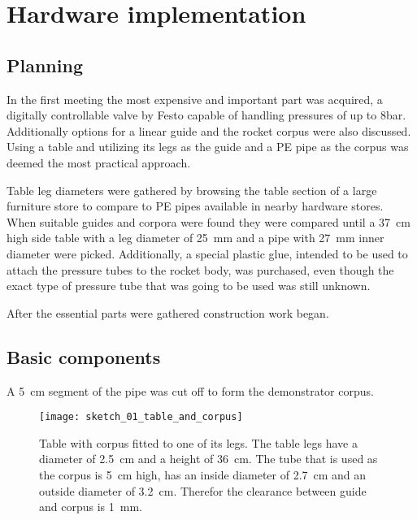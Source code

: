 \section{Hardware implementation}
\author{Sebastian Schaffler}
\subsection{Planning}
In the first meeting the most expensive and important part was acquired, a digitally controllable valve by Festo \cite{festo-valve} capable of handling pressures of up to 8bar. Additionally options for a linear guide and the rocket corpus were also discussed. Using a table and utilizing its legs as the guide and a PE pipe as the corpus was deemed the most practical approach. 

Table leg diameters were gathered by browsing the table section of a large furniture store to compare to PE pipes available in nearby hardware stores. When suitable guides and corpora were found they were compared until a \SI{37}{\centi\meter} high side table with a leg diameter of \SI{25}{\milli\meter} and a pipe with \SI{27}{\milli\meter} inner diameter were picked. Additionally, a special plastic glue, intended to be used to attach the pressure tubes to the rocket body, was purchased, even though the exact type of pressure tube that was going to be used was still unknown.


After the essential parts were gathered construction work began. 

\subsection{Basic components}
A \SI{5}{\centi\meter} segment of the pipe was cut off to form the demonstrator corpus.

\begin{figure}[H]
\centering

\texttt{[image: sketch\_01\_table\_and\_corpus]}

\caption{Table with corpus fitted to one of its legs. The table legs have a diameter of \SI{2,5}{\centi\meter} and a height of \SI{36}{\centi\meter}. The tube that is used as the corpus is \SI{5}{\centi\meter} high, has an inside diameter of \SI{2,7}{\centi\meter} and an outside diameter of \SI{3,2}{\centi\meter}. Therefor the clearance between guide and corpus is \SI{1}{\milli\meter}.}
\end{figure}

